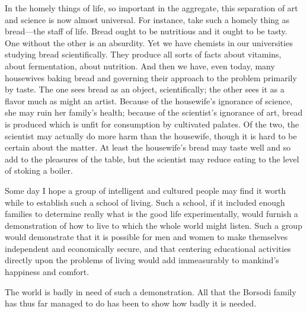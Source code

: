 \documentclass{book}
\begin{document}
In the homely things of life, so important in the aggregate, this separation of art and science is now almost universal. For instance, take such a homely thing as bread—the staff of life. Bread ought to be nutritious and it ought to be tasty. One without the other is an absurdity. Yet we have chemists in our universities studying bread scientifically. They produce all sorts of facts about vitamins, about fermentation, about nutrition. And then we have, even today, many housewives baking bread and governing their approach to the problem primarily by taste. The one sees bread as an object, scientifically; the other sees it as a flavor much as might an artist. Because of the housewife’s ignorance of science, she may ruin her family’s health; because of the scientist’s ignorance of art, bread is produced which is unfit for consumption by cultivated palates. Of the two, the scientist may actually do more harm than the housewife, though it is hard to be certain about the matter. At least the housewife’s bread may taste well and so add to the pleasures of the table, but the scientist may reduce eating to the level of stoking a boiler.

Some day I hope a group of intelligent and cultured people may find it worth while to establish such a school of living. Such a school, if it included enough families to determine really what is the good life experimentally, would furnish a demonstration of how to live to which the whole world might listen. Such a group would demonstrate that it is possible for men and women to make themselves independent and economically secure, and that centering educational activities directly upon the problems of living would add immeasurably to mankind’s happiness and comfort.

The world is badly in need of such a demonstration. All that the Borsodi family has thus far managed to do has been to show how badly it is needed.
\end{document}
